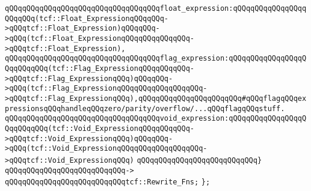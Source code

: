 \verb|qQQqqQQqqQQqqQQqqQQqqQQqqQQqqQQqqQQqfloat_expression:qQQqqQQqqQQqqQQqqQQqqQQq(tcf::Float_ExpressionqQQqqQQq->qQQqtcf::Float_Expression)qQQqqQQq->qQQq(tcf::Float_ExpressionqQQqqQQqqQQqqQQq->qQQqtcf::Float_Expression),|\newline
\verb|qQQqqQQqqQQqqQQqqQQqqQQqqQQqqQQqqQQqflag_expression:qQQqqQQqqQQqqQQqqQQqqQQqqQQq(tcf::Flag_ExpressionqQQqqQQqqQQq->qQQqtcf::Flag_ExpressionqQQq)qQQqqQQq->qQQq(tcf::Flag_ExpressionqQQqqQQqqQQqqQQqqQQq->qQQqtcf::Flag_ExpressionqQQq),qQQqqQQqqQQqqQQqqQQqqQQq#qQQqflagqQQqexpressionsqQQqhandleqQQqzero/parity/overflow/...qQQqflagqQQqstuff.|\newline
\verb|qQQqqQQqqQQqqQQqqQQqqQQqqQQqqQQqqQQqvoid_expression:qQQqqQQqqQQqqQQqqQQqqQQqqQQq(tcf::Void_ExpressionqQQqqQQqqQQq->qQQqtcf::Void_ExpressionqQQq)qQQqqQQq->qQQq(tcf::Void_ExpressionqQQqqQQqqQQqqQQqqQQq->qQQqtcf::Void_ExpressionqQQq)|\newline
\verb|qQQqqQQqqQQqqQQqqQQqqQQqqQQq}|\newline
\verb|qQQqqQQqqQQqqQQqqQQqqQQqqQQq->|\newline
\verb|qQQqqQQqqQQqqQQqqQQqqQQqqQQqtcf::Rewrite_Fns;|\newline
\verb|};|\newline


